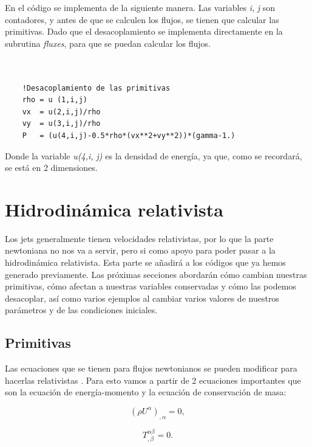 \documentclass[12pt,a4paper]{book}
\begin{document}
En el código se implementa de la siguiente manera.
Las variables \emph{i}, \emph{j} son contadores, y antes de que se calculen los flujos, se tienen que calcular las primitivas. Dado que el desacoplamiento se implementa directamente en la subrutina \emph{fluxes}, para 
que se puedan calcular los flujos.

\begin{lstlisting}[frame=single] 
  

    !Desacoplamiento de las primitivas
    rho = u (1,i,j)
    vx  = u(2,i,j)/rho
    vy  = u(3,i,j)/rho
    P   = (u(4,i,j)-0.5*rho*(vx**2+vy**2))*(gamma-1.)

\end{lstlisting}

\noindent Donde la variable \emph{u(4,i, j)} es la densidad de energía, ya que, como se recordará, se está en 2 dimensiones.
  
\section{Hidrodinámica relativista}
Los jets generalmente tienen velocidades relativistas, por lo que la parte newtoniana no nos va a servir, pero si como apoyo para poder pasar a la hidrodinámica relativista.
Esta parte se añadirá a los códigos que ya hemos generado previamente. Las próximas secciones abordarán cómo cambian nuestras primitivas, cómo afectan a nuestras variables conservadas y cómo las podemos 
desacoplar, así como varios ejemplos al cambiar varios valores de nuestros parámetros y de las condiciones iniciales.

\subsection{Primitivas}
Las ecuaciones que se tienen para flujos newtonianos se pueden modificar para hacerlas relativistas \citep{Marty1999, Landau1987}. Para esto vamos a partir de 2 ecuaciones importantes que son la ecuación de energía-momento y la ecuación de conservación 
de masa:

\begin{equation}\label{ecuacion_conservación_masa}
\left( \rho U^{\alpha} \right)_{, \alpha} =0 ,
\end{equation}

\begin{equation}\label{ecuacion_momento_energia}
T_{, \beta}^{\alpha \beta}=0 .
\end{equation}
\end{document}
